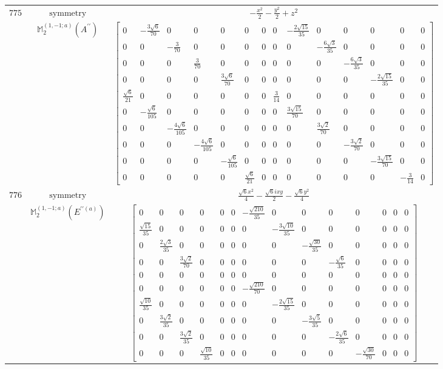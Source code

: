 \documentclass[fleqn,8pt,landscape]{jsarticle}
\begin{document}
\begin{longtable}{ccc}
$ 775 $ & $ \text{symmetry} $ & $ - \frac{x^{2}}{2} - \frac{y^{2}}{2} + z^{2} $ \\
$  $ & $ \mathbb{M}_{2}^{(1,-1;a)}(A^{\prime\prime}) $ & $ \begin{bmatrix} 0 & - \frac{3 \sqrt{6}}{70} & 0 & 0 & 0 & 0 & 0 & 0 & - \frac{2 \sqrt{15}}{35} & 0 & 0 & 0 & 0 & 0 \\ 0 & 0 & - \frac{3}{70} & 0 & 0 & 0 & 0 & 0 & 0 & - \frac{6 \sqrt{3}}{35} & 0 & 0 & 0 & 0 \\ 0 & 0 & 0 & \frac{3}{70} & 0 & 0 & 0 & 0 & 0 & 0 & - \frac{6 \sqrt{3}}{35} & 0 & 0 & 0 \\ 0 & 0 & 0 & 0 & \frac{3 \sqrt{6}}{70} & 0 & 0 & 0 & 0 & 0 & 0 & - \frac{2 \sqrt{15}}{35} & 0 & 0 \\ \frac{\sqrt{6}}{21} & 0 & 0 & 0 & 0 & 0 & 0 & \frac{3}{14} & 0 & 0 & 0 & 0 & 0 & 0 \\ 0 & - \frac{\sqrt{6}}{105} & 0 & 0 & 0 & 0 & 0 & 0 & \frac{3 \sqrt{15}}{70} & 0 & 0 & 0 & 0 & 0 \\ 0 & 0 & - \frac{4 \sqrt{6}}{105} & 0 & 0 & 0 & 0 & 0 & 0 & \frac{3 \sqrt{2}}{70} & 0 & 0 & 0 & 0 \\ 0 & 0 & 0 & - \frac{4 \sqrt{6}}{105} & 0 & 0 & 0 & 0 & 0 & 0 & - \frac{3 \sqrt{2}}{70} & 0 & 0 & 0 \\ 0 & 0 & 0 & 0 & - \frac{\sqrt{6}}{105} & 0 & 0 & 0 & 0 & 0 & 0 & - \frac{3 \sqrt{15}}{70} & 0 & 0 \\ 0 & 0 & 0 & 0 & 0 & \frac{\sqrt{6}}{21} & 0 & 0 & 0 & 0 & 0 & 0 & - \frac{3}{14} & 0 \end{bmatrix} $ \\ \hline
$ 776 $ & $ \text{symmetry} $ & $ \frac{\sqrt{6} x^{2}}{4} - \frac{\sqrt{6} i x y}{2} - \frac{\sqrt{6} y^{2}}{4} $ \\
$  $ & $ \mathbb{M}_{2}^{(1,-1;a)}(E^{\prime\prime(a)}) $ & $ \begin{bmatrix} 0 & 0 & 0 & 0 & 0 & 0 & - \frac{\sqrt{210}}{35} & 0 & 0 & 0 & 0 & 0 & 0 & 0 \\ \frac{\sqrt{15}}{35} & 0 & 0 & 0 & 0 & 0 & 0 & - \frac{3 \sqrt{10}}{35} & 0 & 0 & 0 & 0 & 0 & 0 \\ 0 & \frac{2 \sqrt{3}}{35} & 0 & 0 & 0 & 0 & 0 & 0 & - \frac{\sqrt{30}}{35} & 0 & 0 & 0 & 0 & 0 \\ 0 & 0 & \frac{3 \sqrt{2}}{70} & 0 & 0 & 0 & 0 & 0 & 0 & - \frac{\sqrt{6}}{35} & 0 & 0 & 0 & 0 \\ 0 & 0 & 0 & 0 & 0 & 0 & 0 & 0 & 0 & 0 & 0 & 0 & 0 & 0 \\ 0 & 0 & 0 & 0 & 0 & 0 & - \frac{\sqrt{210}}{70} & 0 & 0 & 0 & 0 & 0 & 0 & 0 \\ \frac{\sqrt{10}}{35} & 0 & 0 & 0 & 0 & 0 & 0 & - \frac{2 \sqrt{15}}{35} & 0 & 0 & 0 & 0 & 0 & 0 \\ 0 & \frac{3 \sqrt{2}}{35} & 0 & 0 & 0 & 0 & 0 & 0 & - \frac{3 \sqrt{5}}{35} & 0 & 0 & 0 & 0 & 0 \\ 0 & 0 & \frac{3 \sqrt{2}}{35} & 0 & 0 & 0 & 0 & 0 & 0 & - \frac{2 \sqrt{6}}{35} & 0 & 0 & 0 & 0 \\ 0 & 0 & 0 & \frac{\sqrt{10}}{35} & 0 & 0 & 0 & 0 & 0 & 0 & - \frac{\sqrt{30}}{70} & 0 & 0 & 0 \end{bmatrix} $ \\ \hline

\end{longtable}
\end{document}
